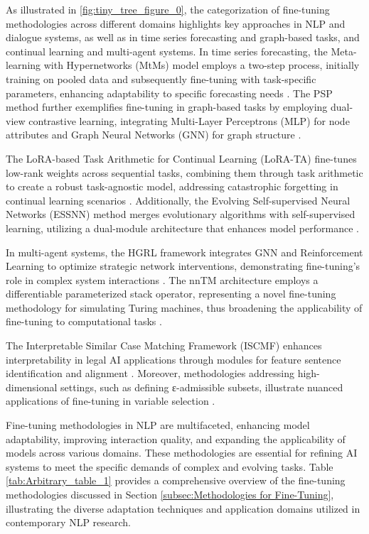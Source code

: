 As illustrated in \autoref{fig:tiny_tree_figure_0}, the categorization of fine-tuning methodologies across different domains highlights key approaches in NLP and dialogue systems, as well as in time series forecasting and graph-based tasks, and continual learning and multi-agent systems. In time series forecasting, the Meta-learning with Hypernetworks (MtMs) model employs a two-step process, initially training on pooled data and subsequently fine-tuning with task-specific parameters, enhancing adaptability to specific forecasting needs \cite{stank2024designingtimeseriesmodelshypernetworks}. The PSP method further exemplifies fine-tuning in graph-based tasks by employing dual-view contrastive learning, integrating Multi-Layer Perceptrons (MLP) for node attributes and Graph Neural Networks (GNN) for graph structure \cite{ge2024psppretrainingstructureprompt}.

The LoRA-based Task Arithmetic for Continual Learning (LoRA-TA) fine-tunes low-rank weights across sequential tasks, combining them through task arithmetic to create a robust task-agnostic model, addressing catastrophic forgetting in continual learning scenarios \cite{chitale2023taskarithmeticloracontinual}. Additionally, the Evolving Self-supervised Neural Networks (ESSNN) method merges evolutionary algorithms with self-supervised learning, utilizing a dual-module architecture that enhances model performance \cite{le2019evolvingselfsupervisedneuralnetworks}.

In multi-agent systems, the HGRL framework integrates GNN and Reinforcement Learning to optimize strategic network interventions, demonstrating fine-tuning's role in complex system interactions \cite{chen2024adaptivenetworkinterventioncomplex}. The nnTM architecture employs a differentiable parameterized stack operator, representing a novel fine-tuning methodology for simulating Turing machines, thus broadening the applicability of fine-tuning to computational tasks \cite{stogin2022provablystableneuralnetwork}.

The Interpretable Similar Case Matching Framework (ISCMF) enhances interpretability in legal AI applications through modules for feature sentence identification and alignment \cite{lin2023interpretabilityframeworksimilarcase}. Moreover, methodologies addressing high-dimensional settings, such as defining ε-admissible subsets, illustrate nuanced applications of fine-tuning in variable selection \cite{williams2018nonpenalizedvariableselectionhighdimensional}.

Fine-tuning methodologies in NLP are multifaceted, enhancing model adaptability, improving interaction quality, and expanding the applicability of models across various domains. These methodologies are essential for refining AI systems to meet the specific demands of complex and evolving tasks. Table \ref{tab:Arbitrary_table_1} provides a comprehensive overview of the fine-tuning methodologies discussed in Section \ref{subsec:Methodologies for Fine-Tuning}, illustrating the diverse adaptation techniques and application domains utilized in contemporary NLP research.

